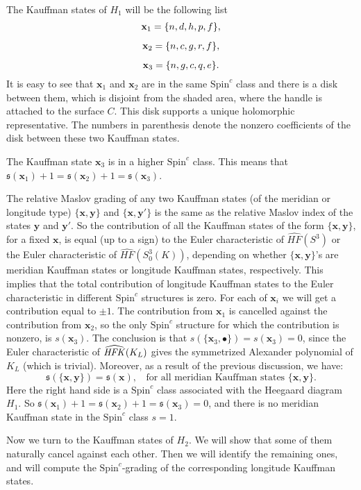 \documentclass{gtart_h}
\theoremstyle{definition}
\newcommand\x{\mathbf x}
\newcommand\y{\mathbf y}
\newcommand{\spinc}{\mathfrak s}
\newcommand\HFK{\text{\it HFK\/}}
\newcommand{\SpinC}{{\mathrm{Spin}}^c}
\begin{document}
The
Kauffman states of $H_1$ will be the following list
\begin{displaymath}
\begin{CD}
\x_1=\{n,d,h,p,f\},\\
\x_2=\{n,c,g,r,f\},\\
\x_3=\{n,g,c,q,e\}.
\end{CD}
\end{displaymath}
It is easy to see that $\x_1$ and $\x_2$ are in the same $\SpinC$ class and there
is a disk between them,
which is disjoint from the shaded area, where the handle
is attached to the surface $C$. This disk supports a unique holomorphic representative.
The numbers in parenthesis denote the nonzero coefficients of the disk between these
two Kauffman states.

The Kauffman state $\x_3$ is in a higher $\SpinC$ class. This means that
$\spinc(\x_1)+1=\spinc(\x_2)+1=\spinc(\x_3)$.

The relative Maslov grading of any two Kauffman states (of the
meridian or longitude type) $\{\x,\y\}$ and $\{\x,\y'\}$ is the
same as the relative Maslov index of the states $\y$ and $\y'$. So
the contribution of all the Kauffman states of the form
$\{\x,\y\}$, for a fixed $\x$, is equal (up to a sign) to the
Euler characteristic of $\widehat{HF}(S^3)$ or the Euler
characteristic of $\widehat{HF}(S^3_0(K))$, depending on whether
$\{\x,\y\}$'s are meridian Kauffman states or longitude Kauffman
states, respectively. This implies that the total contribution of
longitude Kauffman states to the Euler characteristic in different
$\SpinC$ structures is zero. For each of $\x_i$ we will get a
contribution equal to $\pm1$. The contribution from $\x_1$ is
cancelled against the contribution from $\x_2$, so the only
$\SpinC$ structure for which the contribution is nonzero, is
$s(\x_3)$. The conclusion is that $s(\{\x_3,\bullet\})=s(\x_3)=0$,
since the Euler characteristic of $\widehat{\HFK}(K_L)$ gives the
symmetrized Alexander polynomial of $K_L$ (which is trivial).
Moreover, as a result of the previous discussion, we have:
$$\spinc(\{\x,\y\})=\spinc(\x),\ \ \ \ \text{for all meridian Kauffman
  states }\{\x,\y\}.$$
Here the right hand side is a $\SpinC$ class associated with the
  Heegaard diagram $H_1$.
So $\spinc(\x_1)+1=\spinc(\x_2)+1=\spinc(\x_3)=0$, and there is no
meridian Kauffman state in the $\SpinC$ class $s=1$.

Now we turn to the Kauffman states of $H_2$.
We will show that some of them naturally cancel against each other. Then we will identify
the remaining ones, and will compute the $\SpinC$-grading of the corresponding longitude Kauffman
states.
\end{document}
